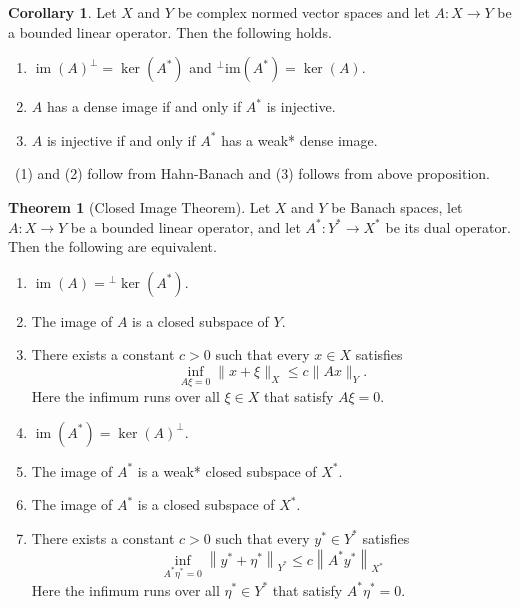 \documentclass[12pt,a4paper]{book}
\newenvironment{prooff}{{\noindent\it\textcolor{cyan!40!black}{Proof}:}\,}{\par}
\newenvironment{enu}{\begin{enumerate}[(1)]}{\end{enumerate}}
\theoremstyle{definition}
\newtheorem{coro}[defn]{Corollary}
\newtheorem{theo}[defn]{Theorem}
\begin{document}
\begin{coro}
    Let $X$ and $Y$ be complex normed vector spaces and let $A: X \rightarrow Y$ be a bounded linear operator. Then the following holds.
    \begin{enu} 
    \item $\operatorname{im}(A)^{\perp}=\operatorname{ker}\left(A^*\right)$ and ${ }^{\perp} \mathrm{im}\left(A^*\right)=\operatorname{ker}(A)$.
    \item $A$ has a dense image if and only if $A^*$ is injective.
    \item $A$ is injective if and only if $A^*$ has a weak* dense image.
    \end{enu}
    \label{corollary: injective, dense image}
\end{coro}
\begin{prooff}
    (1) and (2) follow from Hahn-Banach and (3) follows from above proposition. 
\end{prooff}
\begin{theo}[Closed Image Theorem]
    Let $X$ and $Y$ be Banach spaces, let $A: X \rightarrow Y$ be a bounded linear operator, and let $A^*: Y^* \rightarrow X^*$ be its dual operator. Then the following are equivalent.
\begin{enu} 
    \item $\operatorname{im}(A)={ }^{\perp} \operatorname{ker}\left(A^*\right)$.
    \item The image of $A$ is a closed subspace of $Y$.
    \item There exists a constant $c>0$ such that every $x \in X$ satisfies
    $$
    \inf _{A \xi=0}\|x+\xi\|_X \leq c\|A x\|_Y.
    $$
    Here the infimum runs over all $\xi \in X$ that satisfy $A \xi=0$.
    \item  $\operatorname{im}\left(A^*\right)=\operatorname{ker}(A)^{\perp}$.
    \item The image of $A^*$ is a weak* closed subspace of $X^*$.
    \item  The image of $A^*$ is a closed subspace of $X^*$.
    \item  There exists a constant $c>0$ such that every $y^* \in Y^*$ satisfies 
    $$
    \inf _{A^* \eta^*=0}\left\|y^*+\eta^*\right\|_{Y^*} \leq c\left\|A^* y^*\right\|_{X^*}
    $$
    Here the infimum runs over all $\eta^* \in Y^*$ that satisfy $A^* \eta^*=0$.
\end{enu}
\end{theo}
\end{document}
